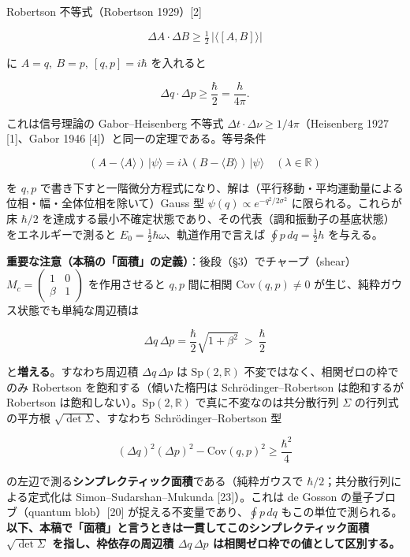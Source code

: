 \documentclass[
]{ltjsarticle}
\begin{document}
Robertson 不等式（Robertson 1929）{[}2{]}

\[\Delta A\cdot\Delta B \ge \tfrac12\,\bigl|\langle[A,B]\rangle\bigr|\]

に \(A=q,\ B=p,\ [q,p]=i\hbar\) を入れると

\[\Delta q\cdot\Delta p \ge \frac{\hbar}{2}=\frac{h}{4\pi}.\]

これは信号理論の Gabor--Heisenberg 不等式
\(\Delta t\cdot\Delta\nu\ge 1/4\pi\)（Heisenberg 1927 {[}1{]}、Gabor
1946 {[}4{]}）と同一の定理である。等号条件

\[(A-\langle A\rangle)\,|\psi\rangle = i\lambda\,(B-\langle B\rangle)\,|\psi\rangle\quad(\lambda\in\mathbb{R})\]

を \(q,p\)
で書き下すと一階微分方程式になり、解は（平行移動・平均運動量による位相・幅・全体位相を除いて）Gauss
型 \(\psi(q)\propto e^{-q^2/2\sigma^2}\) に限られる。これらが床
\(\hbar/2\)
を達成する最小不確定状態であり、その代表（調和振動子の基底状態）をエネルギーで測ると
\(E_0=\tfrac12\hbar\omega\)、軌道作用で言えば \(\oint p\,dq=\tfrac12 h\)
を与える。

\textbf{重要な注意（本稿の「面積」の定義）}：後段（§3）でチャープ（shear）\(M_c=\begin{pmatrix}1&0\\\beta&1\end{pmatrix}\)
を作用させると \(q,p\) 間に相関 \(\mathrm{Cov}(q,p)\neq0\)
が生じ、純粋ガウス状態でも単純な周辺積は

\[\Delta q\,\Delta p=\frac{\hbar}{2}\sqrt{1+\beta^2}\ >\ \frac{\hbar}{2}\]

と\textbf{増える}。すなわち周辺積 \(\Delta q\,\Delta p\) は
\(\mathrm{Sp}(2,\mathbb{R})\) 不変ではなく、相関ゼロの枠でのみ Robertson
を飽和する（傾いた楕円は Schrödinger--Robertson は飽和するが Robertson
は飽和しない）。\(\mathrm{Sp}(2,\mathbb{R})\) で真に不変なのは共分散行列
\(\Sigma\) の行列式の平方根 \(\sqrt{\det\Sigma}\)、すなわち
Schrödinger--Robertson 型

\[(\Delta q)^2(\Delta p)^2-\mathrm{Cov}(q,p)^2 \ge \frac{\hbar^2}{4}\]

の左辺で測る\textbf{シンプレクティック面積}である（純粋ガウスで
\(\hbar/2\)；共分散行列による定式化は Simon--Sudarshan--Mukunda
{[}23{]}）。これは de Gosson の量子ブロブ（quantum blob）{[}20{]}
が捉える不変量であり、\(\oint p\,dq\)
もこの単位で測られる。\textbf{以下、本稿で「面積」と言うときは一貫してこのシンプレクティック面積
\(\sqrt{\det\Sigma}\) を指し、枠依存の周辺積 \(\Delta q\,\Delta p\)
は相関ゼロ枠での値として区別する。}
\end{document}

